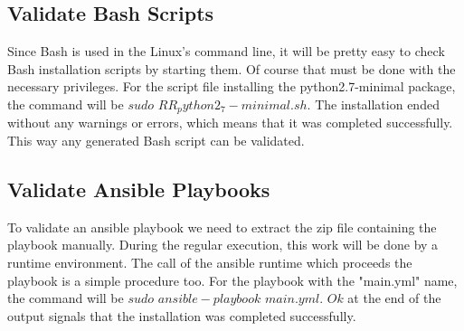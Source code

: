 \subsection*{Validate Bash Scripts}
Since Bash is used in the Linux's command line, it will be pretty easy to check Bash installation scripts by starting them.
Of course that must be done with the necessary privileges.
For the script file installing the python2.7-minimal package, the command will be $sudo$ $RR_python2_7-minimal.sh$.
The installation ended without any warnings or errors, which means that it was completed successfully.
This way any generated Bash script can be validated.

\subsection*{Validate Ansible Playbooks}
To validate an ansible playbook we need to extract the zip file containing the playbook manually. 
During the regular execution, this work will be done by a runtime environment.
The call of the ansible runtime which proceeds the playbook is a simple procedure too.
For the playbook with the "main.yml" name, the command will be $sudo$ $ansible-playbook$ $main.yml$.
$Ok$ at the end of the output signals that the installation was completed successfully.
